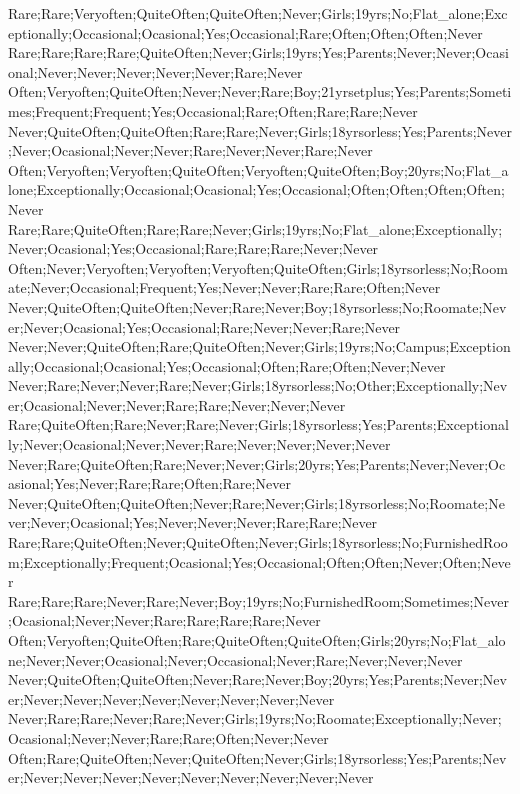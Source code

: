Rare;Rare;Veryoften;QuiteOften;QuiteOften;Never;Girls;19yrs;No;Flat_alone;Exceptionally;Occasional;Ocasional;Yes;Occasional;Rare;Often;Often;Often;Never
Rare;Rare;Rare;Rare;QuiteOften;Never;Girls;19yrs;Yes;Parents;Never;Never;Ocasional;Never;Never;Never;Never;Never;Rare;Never
Often;Veryoften;QuiteOften;Never;Never;Rare;Boy;21yrsetplus;Yes;Parents;Sometimes;Frequent;Frequent;Yes;Occasional;Rare;Often;Rare;Rare;Never
Never;QuiteOften;QuiteOften;Rare;Rare;Never;Girls;18yrsorless;Yes;Parents;Never;Never;Ocasional;Never;Never;Rare;Never;Never;Rare;Never
Often;Veryoften;Veryoften;QuiteOften;Veryoften;QuiteOften;Boy;20yrs;No;Flat_alone;Exceptionally;Occasional;Ocasional;Yes;Occasional;Often;Often;Often;Often;Never
Rare;Rare;QuiteOften;Rare;Rare;Never;Girls;19yrs;No;Flat_alone;Exceptionally;Never;Ocasional;Yes;Occasional;Rare;Rare;Rare;Never;Never
Often;Never;Veryoften;Veryoften;Veryoften;QuiteOften;Girls;18yrsorless;No;Roomate;Never;Occasional;Frequent;Yes;Never;Never;Rare;Rare;Often;Never
Never;QuiteOften;QuiteOften;Never;Rare;Never;Boy;18yrsorless;No;Roomate;Never;Never;Ocasional;Yes;Occasional;Rare;Never;Never;Rare;Never
Never;Never;QuiteOften;Rare;QuiteOften;Never;Girls;19yrs;No;Campus;Exceptionally;Occasional;Ocasional;Yes;Occasional;Often;Rare;Often;Never;Never
Never;Rare;Never;Never;Rare;Never;Girls;18yrsorless;No;Other;Exceptionally;Never;Ocasional;Never;Never;Rare;Rare;Never;Never;Never
Rare;QuiteOften;Rare;Never;Rare;Never;Girls;18yrsorless;Yes;Parents;Exceptionally;Never;Ocasional;Never;Never;Rare;Never;Never;Never;Never
Never;Rare;QuiteOften;Rare;Never;Never;Girls;20yrs;Yes;Parents;Never;Never;Ocasional;Yes;Never;Rare;Rare;Often;Rare;Never
Never;QuiteOften;QuiteOften;Never;Rare;Never;Girls;18yrsorless;No;Roomate;Never;Never;Ocasional;Yes;Never;Never;Never;Rare;Rare;Never
Rare;Rare;QuiteOften;Never;QuiteOften;Never;Girls;18yrsorless;No;FurnishedRoom;Exceptionally;Frequent;Ocasional;Yes;Occasional;Often;Often;Never;Often;Never
Rare;Rare;Rare;Never;Rare;Never;Boy;19yrs;No;FurnishedRoom;Sometimes;Never;Ocasional;Never;Never;Rare;Rare;Rare;Rare;Never
Often;Veryoften;QuiteOften;Rare;QuiteOften;QuiteOften;Girls;20yrs;No;Flat_alone;Never;Never;Ocasional;Never;Occasional;Never;Rare;Never;Never;Never
Never;QuiteOften;QuiteOften;Never;Rare;Never;Boy;20yrs;Yes;Parents;Never;Never;Never;Never;Never;Never;Never;Never;Never;Never
Never;Rare;Rare;Never;Rare;Never;Girls;19yrs;No;Roomate;Exceptionally;Never;Ocasional;Never;Never;Rare;Rare;Often;Never;Never
Often;Rare;QuiteOften;Never;QuiteOften;Never;Girls;18yrsorless;Yes;Parents;Never;Never;Never;Never;Never;Never;Never;Never;Never;Never
